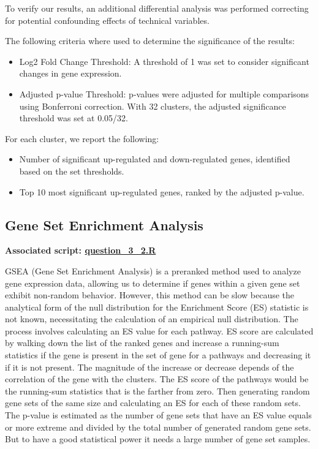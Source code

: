 \documentclass[a4paper, 11pt]{article}
\begin{document}
\begin{multicols}{2}
To verify our results, an additional differential analysis was performed correcting for potential confounding effects of technical variables.

The following criteria where used to determine the significance of the results:
\begin{itemize}
    \item Log2 Fold Change Threshold: A threshold of 1 was set to consider significant changes in gene expression.
    \item Adjusted p-value Threshold: p-values were adjusted for multiple comparisons using Bonferroni correction. With 32 clusters, the adjusted significance threshold was set at 0.05/32.
\end{itemize}
For each cluster, we report the following:
\begin{itemize}
    \item Number of significant up-regulated and down-regulated genes, identified based on the set thresholds.
    \item Top 10 most significant up-regulated genes, ranked by the adjusted p-value.
\end{itemize}

\subsection{Gene Set Enrichment Analysis}
\begin{scriptsize}	
	\textbf{Associated script: \href{https://github.com/leopoldguyot/BINF-F401-Project/blob/main/question_3_2.R}{question\_3\_2.R}
	}
\end{scriptsize}

GSEA (Gene Set Enrichment Analysis) is a preranked method used to analyze gene expression data, allowing us to determine if genes within a given gene set exhibit non-random behavior. However, this method can be slow because the analytical form of the null distribution for the Enrichment Score (ES) statistic is not known, necessitating the calculation of an empirical null distribution.
The process involves calculating an ES value for each pathway. ES score are calculated by walking down the list of the ranked genes and increase a running-sum statistics if the gene is present in the set of gene for  a pathways and decreasing it if it is not present\citep{GSEA}. The magnitude of the increase or decrease  depends of the correlation of the gene with the clusters. The ES score of the pathways would be the running-sum statistics that is the farther from zero. 
Then generating random gene sets of the same size and calculating an ES for each of these random sets. The p-value is estimated as the number of gene sets that have an ES value equals or more extreme and divided by the total number of generated random gene sets. But to have a good statistical power it needs a large number of gene set samples.


\end{multicols}
\end{document}
